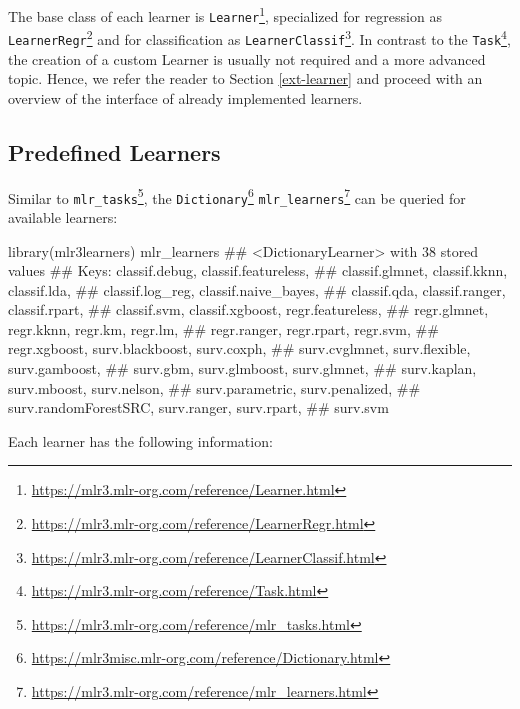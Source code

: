 \documentclass[12pt,]{scrbook}
\newenvironment{Shaded}{}{}
\newcommand{\KeywordTok}[1]{\textcolor[rgb]{0.00,0.00,1.00}{#1}}
\newcommand{\NormalTok}[1]{#1}
\renewcommand{\href}[2]{#2\footnote{\url{#1}}}
\begin{document}
The base class of each learner is \href{https://mlr3.mlr-org.com/reference/Learner.html}{\texttt{Learner}}, specialized for regression as \href{https://mlr3.mlr-org.com/reference/LearnerRegr.html}{\texttt{LearnerRegr}} and for classification as \href{https://mlr3.mlr-org.com/reference/LearnerClassif.html}{\texttt{LearnerClassif}}.
In contrast to the \href{https://mlr3.mlr-org.com/reference/Task.html}{\texttt{Task}}, the creation of a custom Learner is usually not required and a more advanced topic.
Hence, we refer the reader to Section \ref{ext-learner} and proceed with an overview of the interface of already implemented learners.

\hypertarget{learners-predefined}{%
\subsection{Predefined Learners}\label{learners-predefined}}

Similar to \href{https://mlr3.mlr-org.com/reference/mlr_tasks.html}{\texttt{mlr\_tasks}}, the \href{https://mlr3misc.mlr-org.com/reference/Dictionary.html}{\texttt{Dictionary}} \href{https://mlr3.mlr-org.com/reference/mlr_learners.html}{\texttt{mlr\_learners}} can be queried for available learners:

\begin{Shaded}
\begin{Highlighting}[]
\KeywordTok{library}\NormalTok{(mlr3learners)}
\NormalTok{mlr_learners}
\NormalTok{## <DictionaryLearner> with 38 stored values}
\NormalTok{## Keys: classif.debug, classif.featureless,}
\NormalTok{##   classif.glmnet, classif.kknn, classif.lda,}
\NormalTok{##   classif.log_reg, classif.naive_bayes,}
\NormalTok{##   classif.qda, classif.ranger, classif.rpart,}
\NormalTok{##   classif.svm, classif.xgboost, regr.featureless,}
\NormalTok{##   regr.glmnet, regr.kknn, regr.km, regr.lm,}
\NormalTok{##   regr.ranger, regr.rpart, regr.svm,}
\NormalTok{##   regr.xgboost, surv.blackboost, surv.coxph,}
\NormalTok{##   surv.cvglmnet, surv.flexible, surv.gamboost,}
\NormalTok{##   surv.gbm, surv.glmboost, surv.glmnet,}
\NormalTok{##   surv.kaplan, surv.mboost, surv.nelson,}
\NormalTok{##   surv.parametric, surv.penalized,}
\NormalTok{##   surv.randomForestSRC, surv.ranger, surv.rpart,}
\NormalTok{##   surv.svm}
\end{Highlighting}
\end{Shaded}

Each learner has the following information:
\end{document}
